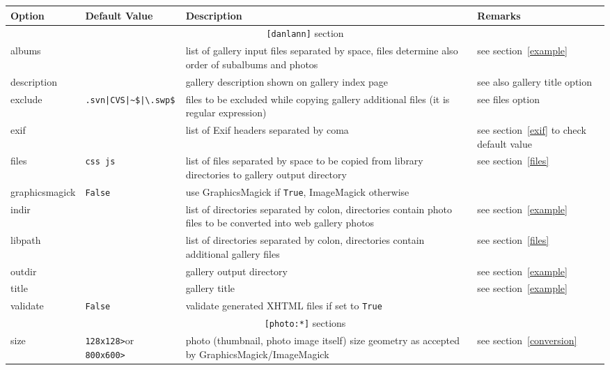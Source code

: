 \documentclass{article}
\begin{document}
\begin{longtable}{|l|p{3cm}|p{6cm}|p{3cm}|}
\hline
\textbf{Option} & \textbf{Default} \textbf{Value} & \textbf{Description} &
\textbf{Remarks} \\
\hline
\hline
\multicolumn{4}{|c|}{\texttt{[danlann]} section}\\
\hline
\hline
albums         &  & list of gallery input files separated by space, files determine also order of subalbums and photos & see section~\ref{example} \\
\hline
description    &  & gallery description shown on gallery index page & see also gallery title option \\
\hline
exclude        & {\small \verb+.svn|CVS|~$|\.swp$+} & files to be excluded while copying gallery additional files (it is regular expression) & see files option \\
\hline
exif           & & list of Exif headers separated by coma & see section~\ref{exif} to check default value \\
\hline
files          & \verb+css js+ & list of files separated by space to be copied from library directories to gallery output directory  &  see section~\ref{files} \\
\hline
graphicsmagick & \texttt{False} & use GraphicsMagick if \texttt{True}, ImageMagick otherwise & \\
\hline
indir          &  & list of directories separated by colon, directories contain photo files to be converted into web gallery photos & see section~\ref{example} \\
\hline
libpath        &  & list of directories separated by colon, directories contain additional gallery files  & see section~\ref{files} \\
\hline
outdir         &  & gallery output directory  & see section~\ref{example} \\
\hline
title          &  & gallery title & see section~\ref{example} \\
\hline
validate       & \texttt{False} & validate generated XHTML files if set to \texttt{True} & \\
\hline
\hline
\multicolumn{4}{|c|}{\texttt{[photo:*]} sections} \\
\hline
\hline
size & \verb+128x128>+\newline or \verb+800x600>+\newline
    & photo (thumbnail, photo image itself) size geometry as accepted by GraphicsMagick/ImageMagick
    & see section~\ref{conversion} \\

\end{longtable}
\end{document}
